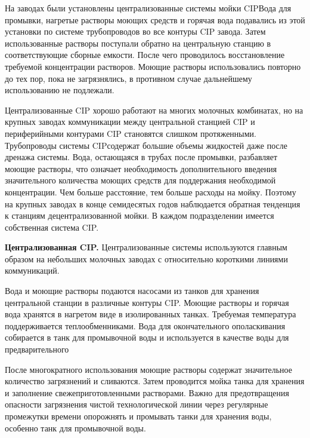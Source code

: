 {\par \redline На заводах были установлены централизованные системы мойки CIPВода для промывки, нагретые растворы моющих средств и горячая вода подавались из этой установки по системе трубопроводов во все контуры CIP завода. Затем использованные растворы поступали обратно на центральную станцию в соответствующие сборные емкости. После чего проводилось восстановление требуемой концентрации растворов. Моющие растворы использовались повторно до тех пор, пока не загрязнялись, в противном случае дальнейшему использованию не подлежали.

\par \redline Централизованные CIP хорошо работают на многих молочных комбинатах, но на крупных заводах коммуникации между центральной станцией CIP и периферийными контурами CIP становятся слишком протяженными. Трубопроводы системы CIPсодержат большие объемы жидкостей даже после дренажа системы. Вода, остающаяся в трубах после промывки, разбавляет моющие растворы, что означает необходимость дополнительного введения значительного количества моющих средств для поддержания необходимой концентрации. Чем больше расстояние, тем больше расходы на мойку. Поэтому на крупных заводах в конце семидесятых годов наблюдается обратная тенденция к станциям децентрализованной мойки. В каждом подразделении имеется собственная система CIP. 


\par \redline \textbf{Централизованная CIP.} Централизованные системы используются главным образом на небольших молочных заводах с относительно короткими линиями коммуникаций.

\par \redline Вода и моющие растворы подаются насосами из танков для хранения центральной станции в различные контуры CIP.
Моющие растворы и горячая вода хранятся в нагретом виде в изолированных танках. Требуемая температура поддерживается теплообменниками. Вода для окончательного ополаскивания собирается в танк для промывочной воды и используется в качестве воды для предварительного

\par \redline После многократного использования моющие растворы содержат значительное количество загрязнений и сливаются. Затем проводится мойка танка для хранения и заполнение свежеприготовленными растворами. Важно для предотвращения опасности загрязнения чистой технологической линии через регулярные промежутки времени опорожнять и промывать танки для хранения воды, особенно танк для промывочной воды.

}
